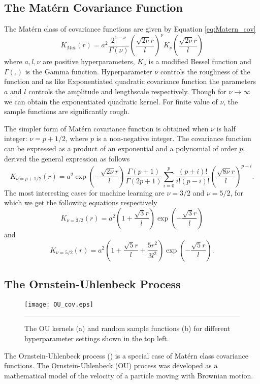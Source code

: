 \subsection{The Mat{\'e}rn Covariance Function}
The Mat{\'e}rn class of covariance functions are given by Equation \ref{eq:Matern_cov}
\begin{equation} \label{eq:Matern_cov}
K_{Mat}(r)= a^2\frac{2^{1-\nu}}{\Gamma(\nu)}\left(\frac{\sqrt{2\nu}r}{l}\right)^\nu K_{\nu}
	  \left(\frac{\sqrt{2\nu}r}{l}\right)
\end{equation}
where $a, l, \nu$ are positive hyperparameters, $K_{\nu}$ is a modified Bessel function and $\Gamma \left(.\right)$ is the Gamma function. Hyperparameter $\nu$ controls the roughness of the function and as like Exponentiated quadratic covariance function the parameters $a$ and $l$ controls the amplitude and lengthscale respectively. Though for $\nu \to \infty$ we can obtain the exponentiated quadratic kernel. For finite value of $\nu$, the sample functions are significantly rough. 

The simpler form of Mat{\'e}rn covariance function is obtained when $\nu$ is half integer: $\nu = p+1/2$, where $p$ is a non-negative integer. The covariance function can be expressed as a product of an exponential and a polynomial of order $p$. \cite{Abramowitz:1965} derived the general expression as follows
\begin{equation} \label{eq:MaternGeneral}
K_{\nu=p+1/2}(r)= a^2\exp \left( - \frac{\sqrt{2\nu}r}{l}\right)\frac{\Gamma\left(p+1\right)}{\Gamma\left(2p+1\right)}
		\sum_{i=0}^{p}\frac{\left(p+i\right)!}{i!\left(p-i\right)!}
		\left(\frac{\sqrt{8\nu}r}{l}\right)^{p-i}.
\end{equation}
The most interesting cases for machine learning are $\nu =3/2$ and $\nu=5/2$, for which we get the following equations respectively
\begin{equation} \label{eq:Matern32}
K_{\nu=3/2}(r)= a^2 \left(1+ \frac{\sqrt{3}r}{l} \right)\exp \left( - \frac{\sqrt{3}r}{l} \right)
\end{equation}
and
\begin{equation} \label{eq:Matern52}
K_{\nu=5/2}(r)= a^2 \left(1+ \frac{\sqrt{5}r}{l} + \frac{5r^2}{3l^2} \right)
		\exp \left( - \frac{\sqrt{5}r}{l} \right).
\end{equation}

\subsection{The Ornstein-Uhlenbeck Process}
\begin{figure}[t]
	\centering
		\texttt{[image: OU\_cov.eps]}
		\rule{35em}{0.5pt}
	\caption[The OU kernels and random sample functions]
		{The OU kernels (a) and random sample functions (b) for different hyperparameter settings shown in the top left.}
	\label{fig:OU_covariance}
\end{figure}
The Ornstein-Uhlenbeck process (\cite{Ornstein_Uhlenbeck:1930}) is a special case of Mat{\'e}rn class covariance functions. The Ornstein-Uhlenbeck (OU) process was developed as a mathematical model of the velocity of a particle moving with Brownian motion.

